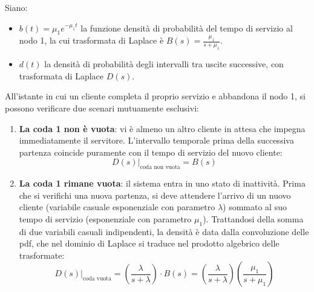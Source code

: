 \documentclass[11pt, a4paper]{article}
\begin{document}

Siano:
\begin{itemize}[noitemsep]
    \item $b(t) = \mu_1 e^{-\mu_1 t}$ la funzione densità di probabilità del tempo di servizio al nodo 1, la cui trasformata di Laplace è $B(s) = \frac{\mu_1}{s + \mu_1}$.
    \item $d(t)$ la densità di probabilità degli intervalli tra uscite successive, con trasformata di Laplace $D(s)$.
\end{itemize}


All'istante in cui un cliente completa il proprio servizio e abbandona il nodo 1, si possono verificare due scenari mutuamente esclusivi:
\begin{enumerate}
    \item \textbf{La coda 1 non è vuota}: vi è almeno un altro cliente in attesa che impegna immediatamente il servitore. L'intervallo temporale prima della successiva partenza coincide puramente con il tempo di servizio del nuovo cliente:
    \[
    D(s) \big|_{\text{coda non vuota}} = B(s)
    \]
    \item \textbf{La coda 1 rimane vuota}: il sistema entra in uno stato di inattività. Prima che si verifichi una nuova partenza, si deve attendere l'arrivo di un nuovo cliente (variabile casuale esponenziale con parametro $\lambda$) sommato al suo tempo di servizio (esponenziale con parametro $\mu_1$). Trattandosi della somma di due variabili casuali indipendenti, la densità è data dalla convoluzione delle pdf, che nel dominio di Laplace si traduce nel prodotto algebrico delle trasformate:
    \[
    D(s) \big|_{\text{coda vuota}} = \left( \frac{\lambda}{s + \lambda} \right) \cdot B(s) = \left( \frac{\lambda}{s + \lambda} \right) \left( \frac{\mu_1}{s + \mu_1} \right)
    \]
\end{enumerate}

\end{document}
